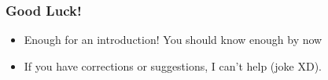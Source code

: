 \begin{frame}
\frametitle{Good Luck!}
\begin{itemize}
\item Enough for an introduction! You should know enough by now
\item If you have corrections or suggestions, I can't help (joke XD).
\end{itemize}
\end{frame}

